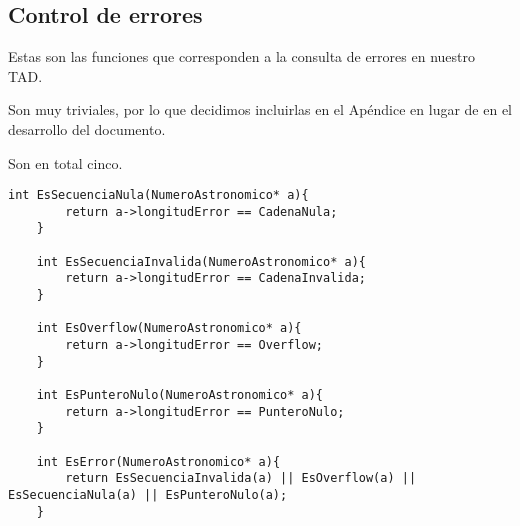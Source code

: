\documentclass[a4paper, 12pt]{article}
\begin{document}
\subsection{Control de errores} \label{errores}

Estas son las funciones que corresponden a la consulta de errores en nuestro TAD.

Son muy triviales, por lo que decidimos incluirlas en el Apéndice en lugar de en el desarrollo del documento.

Son en total cinco.

\begin{lstlisting}[style=C]
    int EsSecuenciaNula(NumeroAstronomico* a){
        return a->longitudError == CadenaNula;
    }
    
    int EsSecuenciaInvalida(NumeroAstronomico* a){
        return a->longitudError == CadenaInvalida;
    }
    
    int EsOverflow(NumeroAstronomico* a){
        return a->longitudError == Overflow;
    }
    
    int EsPunteroNulo(NumeroAstronomico* a){
        return a->longitudError == PunteroNulo;
    }
    
    int EsError(NumeroAstronomico* a){
        return EsSecuenciaInvalida(a) || EsOverflow(a) || EsSecuenciaNula(a) || EsPunteroNulo(a);
    }
\end{lstlisting}
\end{document}
